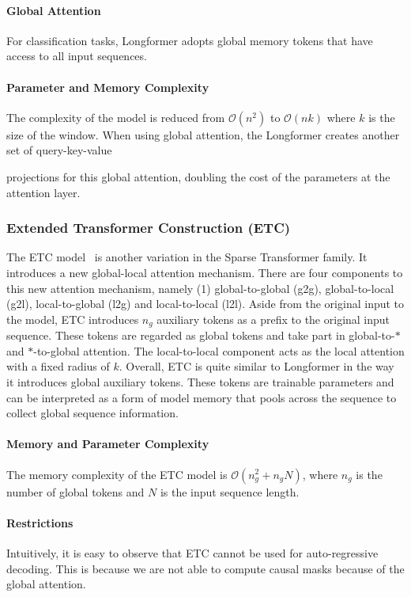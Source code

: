 \paragraph{Global Attention} For classification tasks, Longformer adopts global memory tokens that have access to all input sequences.
\paragraph{Parameter and Memory Complexity} The complexity of the model is reduced from $\mathcal{O}(n^2)$ to $\mathcal{O}(nk)$ where $k$ is the size of the window. When using global attention, the Longformer creates another set of query-key-value

projections for this global attention, doubling the cost of the parameters at the attention layer. 

\subsubsection{Extended Transformer Construction (ETC)} The ETC model~\citep{ainslie2020etc} is another variation in the Sparse Transformer family. It introduces a new global-local attention mechanism. There are four components to this new attention mechanism, namely (1) global-to-global (g2g), global-to-local (g2l), local-to-global (l2g) and local-to-local (l2l). Aside from the original input to the model, ETC introduces $n_g$ auxiliary tokens as a prefix to the original input sequence. These tokens are regarded as global tokens and take part in global-to-$*$ and $*$-to-global attention. The local-to-local component acts as the local attention with a fixed radius of $k$. Overall, ETC is quite similar to Longformer in the way it introduces global auxiliary tokens. These tokens are trainable parameters and can be interpreted as a form of model memory that pools across the sequence to collect global sequence information. 

\paragraph{Memory and Parameter Complexity} The memory complexity of the ETC model is $\mathcal{O}(n_{g}^2 + n_{g}N)$, where $n_g$ is the number of global tokens and $N$ is the input sequence length.

\paragraph{Restrictions} Intuitively, it is easy to observe that ETC cannot be used for auto-regressive decoding. This is because we are not able to compute causal masks because of the global attention. 

